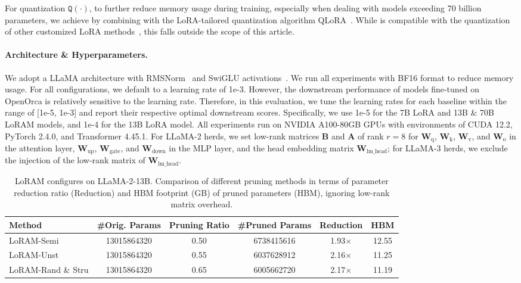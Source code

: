 For quantization $\mathtt{Q}(\cdot)$, to further reduce memory usage during training, especially when dealing with models exceeding 70 billion parameters, we achieve \Qmethod by combining \method with the LoRA-tailored quantization algorithm QLoRA~\citep{Tim:2023qlora}. While \method is compatible with the quantization of other customized LoRA methods~\citep{Xu:2023QALoRA,li2024loftq,guo2024lqlora,OPTQ2023,chai2023int21}, this falls outside the scope of this article.

\paragraph{Architecture \& Hyperparameters.}
We adopt a LLaMA architecture with RMSNorm~\citep{ZhangS19a} and SwiGLU
activations~\citep{Noglu,ZhaoSA22}. 
We run all experiments with BF16 format to reduce memory usage.
For all configurations, we default to a learning rate of 1e-3. However, the downstream performance of models fine-tuned on OpenOrca is relatively sensitive to the learning rate. Therefore, in this evaluation, we tune the learning rates for each baseline within the range of [1e-5, 1e-3] and report their respective optimal downstream scores. Specifically, we use 1e-5 for the 7B LoRA and 13B \& 70B LoRAM models, and 1e-4 for the 13B LoRA model.
All experiments run on NVIDIA A100-80GB GPUs with environments of CUDA 12.2, PyTorch 2.4.0, and Transformer 4.45.1.
For LLaMA-2 herds, we set low-rank matrices $\mathbf{B}$ and $\mathbf{A}$ of rank $r=8$ for $\mathbf{W}_\text{q}$, $\mathbf{W}_\text{k}$, $\mathbf{W}_\text{v}$, and $\mathbf{W}_\text{o}$ in the attention layer, $\mathbf{W}_\text{up}$, $\mathbf{W}_\text{gate}$, and $\mathbf{W}_\text{down}$ in the MLP layer, and the head embedding matrix $\mathbf{W}_\text{lm\_head}$;
for LLaMA-3 herds, we exclude the injection of the low-rank matrix of $\mathbf{W}_\text{lm\_head}$.
\begin{table*}[h]
    \centering
    \renewcommand{\arraystretch}{1.1}
    \setlength{\tabcolsep}{3pt}

    \caption{LoRAM configures on LLaMA-2-13B. Comparison of different pruning methods in terms of parameter reduction ratio (Reduction) and HBM footprint (GB) of pruned parameters (HBM), ignoring low-rank matrix overhead.}
    \label{tab:llama2_13b}
    \begin{tabular}{@{}lccccc@{}}
        \toprule
        Method & \#Orig. Params & Pruning Ratio & \#Pruned Params & Reduction & HBM  \\ 
        \midrule
        LoRAM-Semi & 13015864320 & 0.50 & 6738415616 & 1.93$\times$ & 12.55 \\
        LoRAM-Unst & 13015864320 & 0.55 & 6037628912 & 2.16$\times$ & 11.25 \\
        LoRAM-Rand \& Stru & 13015864320 & 0.65 & 6005662720 & 2.17$\times$ & 11.19 \\
        \bottomrule
    \end{tabular}
\end{table*}

